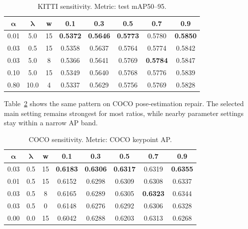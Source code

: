 \begin{table}[htbp]
\centering
\caption{KITTI \model sensitivity. Metric: test mAP50--95.}
\label{tab:kitti-rpc-sensitivity}
\small
\setlength{\tabcolsep}{4pt}
\begin{tabular}{c c c c c c c c}
\toprule
\rowcolor{sectiongray} $\boldsymbol{\alpha}$ & $\boldsymbol{\lambda}$ & \textbf{w} & \textbf{0.1} & \textbf{0.3} & \textbf{0.5} & \textbf{0.7} & \textbf{0.9} \\
\midrule
0.01 & 5.0 & 15 & \textbf{0.5372} & \textbf{0.5646} & \textbf{0.5773} & 0.5780 & \textbf{0.5850} \\
0.03 & 0.5 & 15 & 0.5358 & 0.5637 & 0.5764 & 0.5774 & 0.5842 \\
0.03 & 5.0 & 8 & 0.5366 & 0.5641 & 0.5769 & \textbf{0.5784} & 0.5847 \\
0.10 & 5.0 & 15 & 0.5349 & 0.5640 & 0.5768 & 0.5776 & 0.5839 \\
0.80 & 10.0 & 4 & 0.5337 & 0.5629 & 0.5756 & 0.5769 & 0.5828 \\
\bottomrule
\end{tabular}
\end{table}

Table~\ref{tab:coco-rpc-sensitivity} shows the same pattern on COCO pose-estimation repair. The selected main setting remains strongest for most ratios, while nearby \model parameter settings stay within a narrow AP band.

\begin{table}[htbp]
\centering
\caption{COCO \model sensitivity. Metric: COCO keypoint AP.}
\label{tab:coco-rpc-sensitivity}
\small
\setlength{\tabcolsep}{4pt}
\begin{tabular}{c c c c c c c c}
\toprule
\rowcolor{sectiongray} $\boldsymbol{\alpha}$ & $\boldsymbol{\lambda}$ & \textbf{w} & \textbf{0.1} & \textbf{0.3} & \textbf{0.5} & \textbf{0.7} & \textbf{0.9} \\
\midrule
0.03 & 0.5 & 15 & \textbf{0.6183} & \textbf{0.6306} & \textbf{0.6317} & 0.6319 & \textbf{0.6355} \\
0.01 & 0.5 & 15 & 0.6152 & 0.6298 & 0.6309 & 0.6308 & 0.6337 \\
0.03 & 0.5 & 8 & 0.6165 & 0.6289 & 0.6305 & \textbf{0.6323} & 0.6344 \\
0.03 & 0.5 & 0 & 0.6148 & 0.6276 & 0.6292 & 0.6306 & 0.6328 \\
0.00 & 0.0 & 15 & 0.6042 & 0.6288 & 0.6203 & 0.6313 & 0.6268 \\
\bottomrule
\end{tabular}
\end{table}

